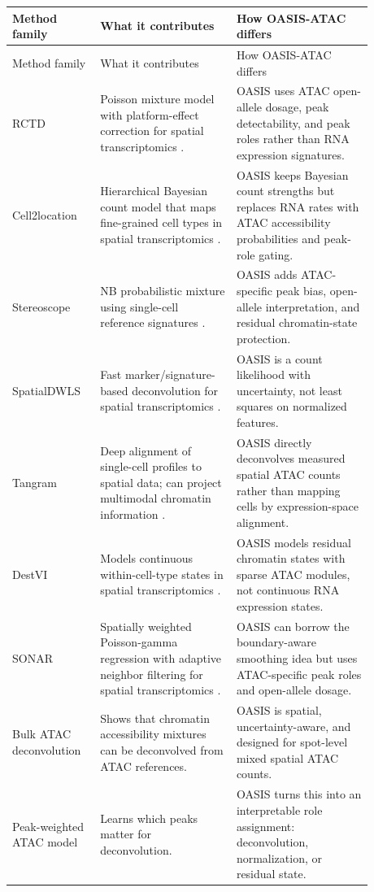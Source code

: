 \documentclass[11pt]{article}
\begin{document}
\begin{longtable}{p{0.20\linewidth}p{0.34\linewidth}p{0.34\linewidth}}
\toprule
Method family & What it contributes & How OASIS-ATAC differs \\
\midrule
\endfirsthead
\toprule
Method family & What it contributes & How OASIS-ATAC differs \\
\midrule
\endhead
RCTD & Poisson mixture model with platform-effect correction for spatial transcriptomics \cite{cable2022rctd}. & OASIS uses ATAC open-allele dosage, peak detectability, and peak roles rather than RNA expression signatures. \\
Cell2location & Hierarchical Bayesian count model that maps fine-grained cell types in spatial transcriptomics \cite{kleshchevnikov2022cell2location}. & OASIS keeps Bayesian count strengths but replaces RNA rates with ATAC accessibility probabilities and peak-role gating. \\
Stereoscope & NB probabilistic mixture using single-cell reference signatures \cite{andersson2020stereoscope}. & OASIS adds ATAC-specific peak bias, open-allele interpretation, and residual chromatin-state protection. \\
SpatialDWLS & Fast marker/signature-based deconvolution for spatial transcriptomics \cite{dong2021spatialdwls}. & OASIS is a count likelihood with uncertainty, not least squares on normalized features. \\
Tangram & Deep alignment of single-cell profiles to spatial data; can project multimodal chromatin information \cite{biancalani2021tangram}. & OASIS directly deconvolves measured spatial ATAC counts rather than mapping cells by expression-space alignment. \\
DestVI & Models continuous within-cell-type states in spatial transcriptomics \cite{lopez2021destvi}. & OASIS models residual chromatin states with sparse ATAC modules, not continuous RNA expression states. \\
SONAR & Spatially weighted Poisson-gamma regression with adaptive neighbor filtering for spatial transcriptomics \cite{liu2023sonar}. & OASIS can borrow the boundary-aware smoothing idea but uses ATAC-specific peak roles and open-allele dosage. \\
Bulk ATAC deconvolution & Shows that chromatin accessibility mixtures can be deconvolved from ATAC references. & OASIS is spatial, uncertainty-aware, and designed for spot-level mixed spatial ATAC counts. \\
Peak-weighted ATAC model & Learns which peaks matter for deconvolution. & OASIS turns this into an interpretable role assignment: deconvolution, normalization, or residual state. \\
\bottomrule
\end{longtable}
\end{document}
